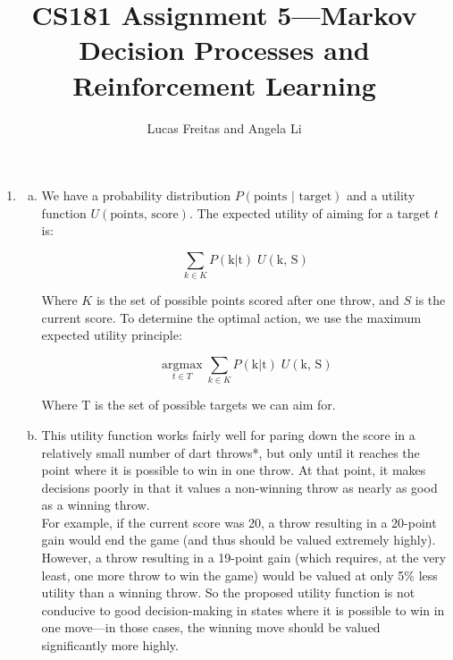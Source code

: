 \documentclass{article}
\title{CS181 Assignment 5---Markov Decision Processes and Reinforcement Learning}
\author{Lucas Freitas and Angela Li}
\begin{document}
\maketitle
    
    \begin{enumerate}
        \item
            \begin{enumerate}[(a)]
                \item We have a probability distribution $P(\text{points } | \text{ target})$ and a utility function $U(\text{points, score})$. The expected utility of aiming for a target $t$ is:

                $$\sum_{k \in K} P(\text{k} | \text{t}) \; U(\text{k, S})$$

                Where $K$ is the set of possible points scored after one throw, and $S$ is the current score. To determine the optimal action, we use the maximum expected utility principle:

                $$\underset{t \in T}{\operatorname{argmax}} \sum_{k \in K} P(\text{k} | \text{t}) \; U(\text{k, S})$$

                Where T is the set of possible targets we can aim for.

                \item This utility function works fairly well for paring down the score in a relatively small number of dart throws*, but only until it reaches the point where it is possible to win in one throw. At that point, it makes decisions poorly in that it values a non-winning throw as nearly as good as a winning throw. \\

                For example, if the current score was 20, a throw resulting in a 20-point gain would end the game (and thus should be valued extremely highly). However, a throw resulting in a 19-point gain (which requires, at the very least, one more throw to win the game) would be valued at only 5\% less utility than a winning throw. So the proposed utility function is not conducive to good decision-making in states where it is possible to win in one move---in those cases, the winning move should be valued significantly more highly. \\


\end{enumerate}
\end{enumerate}
\end{document}
